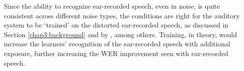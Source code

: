 % 






Since the ability to recognize ear-recorded speech, even in noise, is quite consistent across different noise types, the conditions are right for the auditory system to be `trained' on the distorted ear-recorded speech, as discussed in Section \ref{chap3:background} and by \cite{mattys:12}, among others.  Training, in theory, would increase the learners' recognition of the ear-recorded speech with additional exposure, further increasing the WER improvement seen with ear-recorded speech.



